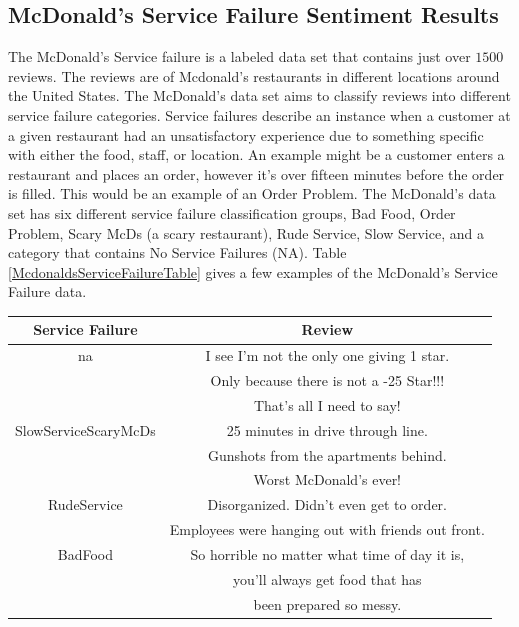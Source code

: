 \documentclass[titlepage,letterpaper]{article}
\begin{document}
\subsection{McDonald's Service Failure Sentiment Results}

The McDonald's Service failure is a labeled data set that contains just over $1500$ reviews. The reviews are of Mcdonald's restaurants in different locations around the United States. The McDonald's data set aims to classify reviews into different service failure categories. Service failures describe an instance when a customer at a given restaurant had an unsatisfactory experience due to something specific with either the food, staff, or location. An example might be a customer enters a restaurant and places an order, however it's over fifteen minutes before the order is filled. This would be an example of an Order Problem. The McDonald's data set has six different service failure classification groups, Bad Food, Order Problem, Scary McDs (a scary restaurant), Rude Service, Slow Service, and a category that contains No Service Failures (NA). Table \cref{McdonaldsServiceFailureTable} gives a few examples of the McDonald's Service Failure data. 


 \begin{center}
	\centering
	\begin{tabular}{ |c|c| } 
		\hline
		Service Failure & Review \\
		\hline \hline
		na & I see I'm not the only one giving 1 star. \\
		 & Only because there is not a -25 Star!!! \\
		  & That's all I need to say! \\
		\hline
		SlowServiceScaryMcDs &  25 minutes in drive through line. \\
		& Gunshots from the apartments behind. \\
		& Worst McDonald's ever! \\
		\hline
		RudeService & Disorganized. Didn't even get to order. \\
		& Employees were hanging out with friends out front.  \\ 
		\hline
		BadFood & So horrible no matter what time of day it is, \\
		& you'll always get food that has \\ 
		& been prepared so messy. \\
		\hline
	\end{tabular}
	\label{McdonaldsServiceFailureTable}
\end{center}
\end{document}
